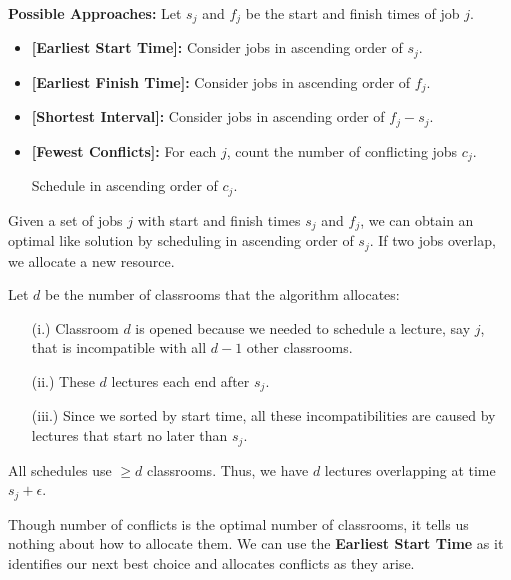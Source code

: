 \newpage
\textbf{Possible Approaches:} Let $s_j$ and $f_j$ be the start and finish times of job $j$.
\begin{itemize}
    \item \textbf{[Earliest Start Time]:} Consider jobs in ascending order of $s_j$.
    \item \textbf{[Earliest Finish Time]:} Consider jobs in ascending order of $f_j$.
    \item \textbf{[Shortest Interval]:} Consider jobs in ascending order of $f_j - s_j$.
    \item \textbf{[Fewest Conflicts]:} For each $j$, count the number of conflicting jobs $c_j$. \par
    \hspace{9.3em} Schedule in ascending order of $c_j$.
\end{itemize}
\begin{theo}

    Given a set of jobs $j$ with start and finish times $s_j$ and $f_j$, we can obtain an optimal like solution by scheduling in ascending order of $s_j$.
    If two jobs overlap, we allocate a new resource.
\end{theo}

\begin{Proof}
    Let $d$ be the number of classrooms that the algorithm allocates:

    \begin{enumerate}
        \item [(i.)] Classroom $d$ is opened because we needed to schedule a lecture, say $j$, that is incompatible with all $d - 1$ other classrooms.
        \item [(ii.)] These $d$ lectures each end after $s_j$.
        \item [(iii.)] Since we sorted by start time, all these incompatibilities are caused by lectures that start no later than $s_j$.
    \end{enumerate}
    \noindent
    All schedules use $\geq d$ classrooms. Thus, we have $d$ lectures overlapping at time $s_j + \epsilon$.

    \end{Proof}

    \begin{Tip}
        Though number of conflicts is the optimal number of classrooms, it tells us nothing about how to allocate them. We can use the \textbf{Earliest Start Time} as 
        it identifies our next best choice and allocates conflicts as they arise.
    \end{Tip}

